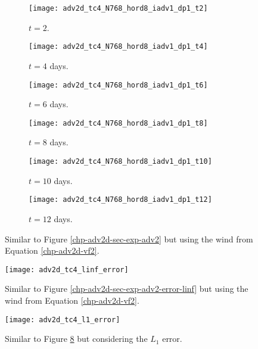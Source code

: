 \begin{figure}[!htb]
	\centering
	\begin{subfigure}{0.3\textwidth}
		\centering
		\texttt{[image: adv2d\_tc4\_N768\_hord8\_iadv1\_dp1\_t2]}
		\caption{$t=2$.\label{chp-adv2d-sec-exp-adv3-a}}
	\end{subfigure}
	\begin{subfigure}{0.3\textwidth}
		\centering
		\texttt{[image: adv2d\_tc4\_N768\_hord8\_iadv1\_dp1\_t4]}
		\caption{$t=4$ days.\label{chp-adv2d-sec-exp-adv3-b}}
	\end{subfigure}
	\begin{subfigure}{0.3\textwidth}
		\centering
		\texttt{[image: adv2d\_tc4\_N768\_hord8\_iadv1\_dp1\_t6]}
		\caption{$t=6$ days.\label{chp-adv2d-sec-exp-adv3-c}}
	\end{subfigure}
	
	\begin{subfigure}{0.3\textwidth}
		\centering
		\texttt{[image: adv2d\_tc4\_N768\_hord8\_iadv1\_dp1\_t8]}
		\caption{$t=8$ days.\label{chp-adv2d-sec-exp-adv3-d}}
	\end{subfigure}
	\begin{subfigure}{0.3\textwidth}
		\centering
		\texttt{[image: adv2d\_tc4\_N768\_hord8\_iadv1\_dp1\_t10]}
		\caption{$t=10$ days.\label{chp-adv2d-sec-exp-adv3-e}}
	\end{subfigure}
	\begin{subfigure}{0.3\textwidth}
		\centering
		\texttt{[image: adv2d\_tc4\_N768\_hord8\_iadv1\_dp1\_t12]}
		\caption{$t=12$ days.\label{chp-adv2d-sec-exp-adv3-f}}
	\end{subfigure}
\caption{Similar to Figure \ref{chp-adv2d-sec-exp-adv2}
but using the wind from Equation \eqref{chp-adv2d-vf2}.\label{chp-adv2d-sec-exp-adv3}}
\end{figure}


\begin{figure}[!htb]
\centering
\texttt{[image: adv2d\_tc4\_linf\_error]}
\caption{Similar to Figure \ref{chp-adv2d-sec-exp-adv2-error-linf}
but using the wind from Equation \eqref{chp-adv2d-vf2}.\label{chp-adv2d-sec-exp-adv3-error-linf}}
\end{figure}

\begin{figure}[!htb]
\centering
\texttt{[image: adv2d\_tc4\_l1\_error]}
\caption{Similar to Figure \ref{chp-adv2d-sec-exp-adv3-error-linf} but considering the $L_1$ error.
\label{chp-adv2d-sec-exp-adv3-error-l1}}
\end{figure}

